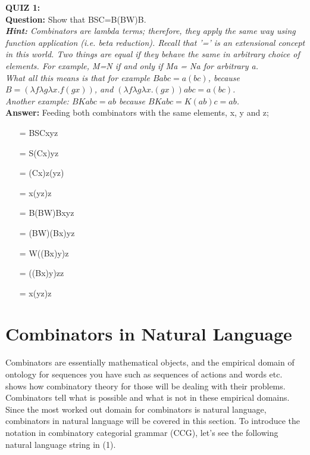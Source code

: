 \documentclass[12pt,a4paper]{article}
\begin{document}
\textbf{\Large{QUIZ 1:}}\\

\textbf{Question:} Show that \textsf{BSC=B(BW)B}.\\

\noindent \textit{\textbf{Hint:} Combinators are lambda terms; therefore, they apply the same way using function application (i.e. beta reduction). Recall that '=' is an extensional concept in this world. Two things are equal if they behave the same in arbitrary choice of elements. For example, M=N if and only if Ma = Na for arbitrary a.}\\
\textit{What all this means is that for example $Babc=a(bc)$, because $B=(\lambda f\lambda g\lambda x.f(gx))$, and $(\lambda f\lambda g\lambda x.(gx))abc=a(bc)$.}\\
\textit{Another example: $BKabc=ab$ because $BKabc=K(ab)c=ab$.} \\

\textbf{Answer:} Feeding both combinators with the same elements, x, y and z;

\begin{multicols}{2}
\begin{itemize}
\item[=]\textsf{BSC}xyz
\item[=]\textsf{S}(\textsf{C}x)yz
\item[=](\textsf{C}x)z(yz)
\item[=]x(yz)z
\end{itemize}

\columnbreak

\begin{itemize}
\item[=]\textsf{B(BW)B}xyz
\item[=]\textsf{(BW)(B}x)yz
\item[=]\textsf{W((B}x)y)z
\item[=]((\textsf{B}x)y)zz
\item[=]x(yz)z
\end{itemize}

\end{multicols}

\clearpage

\section{Combinators in Natural Language}
Combinators are essentially mathematical objects, and the empirical domain of ontology for sequences you have such as sequences of actions and words etc. shows how combinatory theory for those will be dealing with their problems. Combinators tell what is possible and what is not in these empirical domains. Since the most worked out domain for combinators is natural language, combinators in natural language will be covered in this section. To introduce the notation in combinatory categorial grammar (CCG), let's see the following natural language string in (1).
\end{document}
